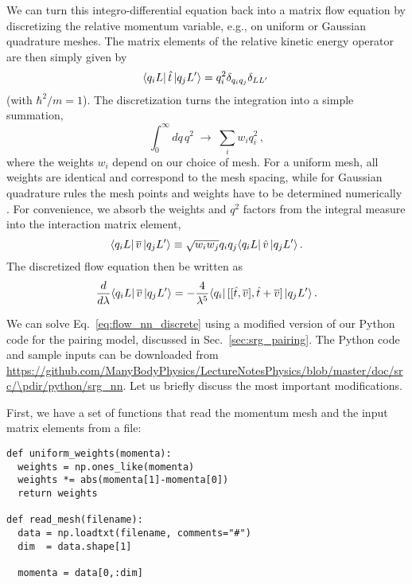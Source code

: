 {We can turn this integro-differential equation back into a matrix 
flow equation by discretizing the relative momentum variable, e.g.,
on uniform or Gaussian quadrature meshes. The matrix elements of the 
relative kinetic energy operator are then simply given by
\begin{equation}
  \langle{q_iL}|\,{\hat{t}}\,|{q_jL'}\rangle=q_i^2 \delta_{q_iq_j}\delta_{LL'}\,
\end{equation}
(with $\hbar^2/m=1$). The discretization turns the integration
into a simple summation,
\begin{equation}
  \int_0^\infty dq\,q^2\;\rightarrow\;\sum_{i}w_i q^2_i\,,
\end{equation}
where the weights $w_i$ depend on our choice of mesh. For a uniform
mesh, all weights are identical and correspond to the mesh spacing,
while for Gaussian quadrature rules the mesh points and weights have
to be determined numerically \cite{Press:2007vn}. For convenience,
we absorb the weights and $q^2$ factors from the integral measure into 
the interaction matrix element,
\begin{equation}
  \langle{q_iL}|\,{\overline{v}}\,|{q_jL'}\rangle \equiv \sqrt{w_iw_j}q_i q_j\langle{q_iL}|\,{\hat{v}}\,|{q_jL'}\rangle\,.
\end{equation}
The discretized flow equation then be written as
\begin{equation}\label{eq:flow_nn_discrete}
  \totd{}{\lambda} \matrixe{q_iL}{\overline{v}}{q_jL'} = - \frac{4}{\lambda^5}
    \matrixe{q_i}{\comm{\comm{\tO}{\overline{v}}}{\tO+\overline{v}}}{q_jL'}\,.
\end{equation}

We can solve Eq.~\eqref{eq:flow_nn_discrete} using a modified version of our 
Python code for the pairing model, discussed in Sec.~\ref{sec:srg_pairing}.
The Python code and sample inputs can be downloaded from 
\url{https://github.com/ManyBodyPhysics/LectureNotesPhysics/blob/master/doc/src/\pdir/python/srg_nn}.
Let us briefly discuss the most important modifications.

First, we have a set of functions that read the momentum mesh
and the input matrix elements from a file:
\begin{lstlisting}
def uniform_weights(momenta):
  weights = np.ones_like(momenta)
  weights *= abs(momenta[1]-momenta[0])
  return weights

def read_mesh(filename):
  data = np.loadtxt(filename, comments="#")  
  dim  = data.shape[1]
  
  momenta = data[0,:dim]


\end{lstlisting}}
